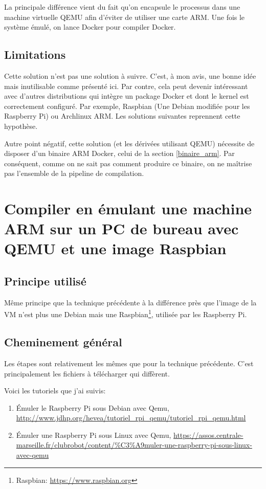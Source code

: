 \documentclass[11pt,a4paper,oneside]{report}
\begin{document}
La principale différence vient du fait qu'on encapsule le processus dans une machine virtuelle QEMU afin d'éviter de utiliser une carte ARM. Une fois le système émulé, on lance Docker pour compiler Docker.

\subsection{Limitations}

Cette solution n'est pas une solution à suivre. C'est, à mon avis, une bonne idée mais inutilisable comme présenté ici. Par contre, cela peut devenir intéressant avec d'autres distributions qui intègre un package Docker et dont le kernel est correctement configuré. Par exemple, Raspbian (Une Debian modifiée pour les Raspberry Pi) ou Archlinux ARM. Les solutions suivantes reprennent cette hypothèse\label{hypothese_debian}.


Autre point négatif, cette solution (et les dérivées utilisant QEMU) nécessite de disposer d'un binaire ARM Docker, celui de la section \ref{binaire_arm}. Par conséquent, comme on ne sait pas comment produire ce binaire, on ne maîtrise pas l'ensemble de la pipeline de compilation.


\section{Compiler en émulant une machine ARM sur un PC de bureau avec QEMU et une image Raspbian}

\subsection{Principe utilisé}

Même principe que la technique précédente à la différence près que l'image de la VM n'est plus une Debian mais une Raspbian\footnote{Raspbian: \url{https://www.raspbian.org}}, utilisée par les Raspberry Pi.

\subsection{Cheminement général}

Les étapes sont relativement les mêmes que pour la technique précédente. C'est principalement les fichiers à télécharger qui diffèrent.

Voici les tutoriels que j'ai suivis:

\begin{enumerate}
\item Émuler le Raspberry Pi sous Debian avec Qemu, \url{http://www.jdhp.org/hevea/tutoriel_rpi_qemu/tutoriel_rpi_qemu.html}
\item Émuler une Raspberry Pi sous Linux avec Qemu, \url{https://assos.centrale-marseille.fr/clubrobot/content/%C3%A9muler-une-raspberry-pi-sous-linux-avec-qemu}
\end{enumerate}
\end{document}
